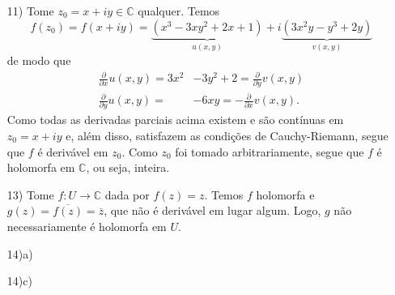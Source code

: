 \documentclass[12pt,a4paper]{article}
\begin{document}
\begin{enumerate}
	\item[11)] Tome $z_0 = x + iy\in\mathbb{C}$ qualquer. Temos
	$$
	f(z_0) = f(x+iy) = \underbrace{(x^3 - 3xy^2 + 2x + 1)}_{u(x,y)} + i\underbrace{(3x^2y - y^3 + 2y)}_{v(x,y)}
	$$
	de modo que
	\begin{align*} 
	\frac{\partial}{\partial x}u(x,y) = 3x^2 &- 3y^2 + 2 = \frac{\partial}{\partial y}v(x,y) \\
	\frac{\partial}{\partial y}u(x,y) = &-6xy = - \frac{\partial}{\partial x}v(x,y).
	\end{align*}
	Como todas as derivadas parciais acima existem e são contínuas em $z_0 = x+iy$ e, além disso, satisfazem as condições de Cauchy-Riemann, segue que $f$ é derivável em $z_0$. Como $z_0$ foi tomado arbitrariamente, segue que $f$ é holomorfa em $\mathbb{C}$, ou seja, inteira.
	
	\item[13)] Tome $f:U\to\mathbb{C}$ dada por $f(z) = z$. Temos $f$ holomorfa e $g(z) = \overline{f(z)} = \overline{z}$, que não é derivável em lugar algum. Logo, $g$ não necessariamente é holomorfa em $U$.
	
	\item[14)a)]
	
	\item[14)c)]
	\end{enumerate}
	
\end{document}
